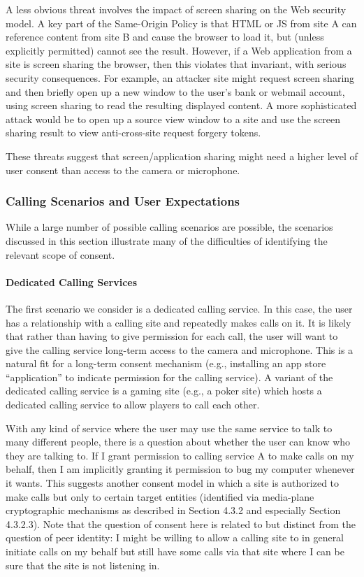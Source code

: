 \documentclass{article}
\begin{document}
A less obvious threat involves the impact of screen sharing on the
Web security model.  A key part of the Same-Origin Policy is that
HTML or JS from site A can reference content from site B and cause
the browser to load it, but (unless explicitly permitted) cannot see
the result.  However, if a Web application from a site is screen
sharing the browser, then this violates that invariant, with serious
security consequences.  For example, an attacker site might request
screen sharing and then briefly open up a new window to the user's
bank or webmail account, using screen sharing to read the resulting
displayed content.  A more sophisticated attack would be to open up a
source view window to a site and use the screen sharing result to
view anti-cross-site request forgery tokens.

These threats suggest that screen/application sharing might need a
higher level of user consent than access to the camera or microphone.

\subsubsection{Calling Scenarios and User Expectations}

While a large number of possible calling scenarios are possible, the
scenarios discussed in this section illustrate many of the
difficulties of identifying the relevant scope of consent.

\paragraph{Dedicated Calling Services}

The first scenario we consider is a dedicated calling service.  In
this case, the user has a relationship with a calling site and
repeatedly makes calls on it.  It is likely that rather than having
to give permission for each call, the user will want to give the
calling service long-term access to the camera and microphone.  This
is a natural fit for a long-term consent mechanism (e.g., installing
an app store ``application'' to indicate permission for the calling
service).  A variant of the dedicated calling service is a gaming
site (e.g., a poker site) which hosts a dedicated calling service to
allow players to call each other.

With any kind of service where the user may use the same service to
talk to many different people, there is a question about whether the
user can know who they are talking to.  If I grant permission to
calling service A to make calls on my behalf, then I am implicitly
granting it permission to bug my computer whenever it wants.  This
suggests another consent model in which a site is authorized to make
calls but only to certain target entities (identified via media-plane
cryptographic mechanisms as described in Section 4.3.2 and especially
Section 4.3.2.3).  Note that the question of consent here is related
to but distinct from the question of peer identity: I might be
willing to allow a calling site to in general initiate calls on my
behalf but still have some calls via that site where I can be sure
that the site is not listening in.
\end{document}
